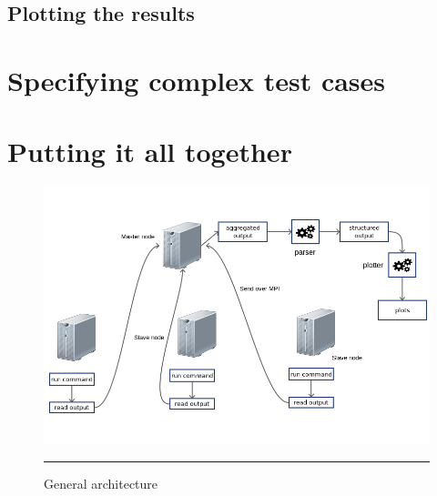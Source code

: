 
\subsection{Plotting the results}





\section{Specifying complex test cases}




\section{Putting it all together}

\begin{figure}[H]
  \centering
    \includegraphics[scale=0.5]{Figures/architecture.png}
    \rule{25em}{0.5pt}
  \caption[General architecture]{General architecture}
  \label{fig:architecture}
\end{figure}


